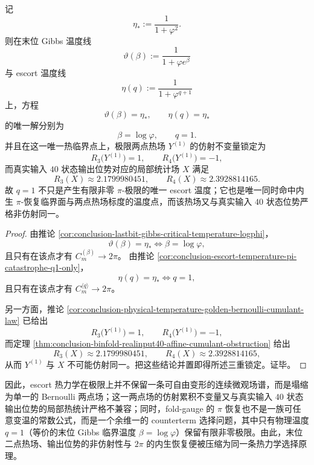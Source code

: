 \begin{corollary}[物理温度 \texorpdfstring{$q=1$}{q=1} 的唯一三重锁定]\label{cor:conclusion-physical-temperature-q1-unique-triple-lock}
记
\[
\eta_*:=\frac{1}{1+\varphi^2}.
\]
则在末位 Gibbs 温度线
\[
\vartheta(\beta):=\frac{1}{1+\varphi e^\beta}
\]
与 escort 温度线
\[
\eta(q):=\frac{1}{1+\varphi^{q+1}}
\]
上，方程
\[
\vartheta(\beta)=\eta_*,
\qquad
\eta(q)=\eta_*
\]
的唯一解分别为
\[
\beta=\log\varphi,
\qquad
q=1.
\]
并且在这一唯一热临界点上，极限两点热场 \(Y^{(1)}\) 的仿射不变量锁定为
\[
R_3\bigl(Y^{(1)}\bigr)=1,
\qquad
R_4\bigl(Y^{(1)}\bigr)=-1,
\]
而真实输入 \(40\) 状态输出位势对应的局部统计场 \(X\) 满足
\[
R_3(X)\approx 2.1799980451,
\qquad
R_4(X)\approx 2.3928814165.
\]
故 \(q=1\) 不只是产生有限非零 \(\pi\)-极限的唯一 escort 温度；它也是唯一同时命中内生 \(\pi\)-恢复临界面与两点热场标度的温度点，而该热场又与真实输入 \(40\) 状态位势严格非仿射同一。
\end{corollary}
\begin{proof}
由推论 \ref{cor:conclusion-lastbit-gibbs-critical-temperature-logphi}，
\[
\vartheta(\beta)=\eta_*
\iff
\beta=\log\varphi,
\]
且只有在该点才有
\(
C_m^{(\beta)}\to 2\pi
\)。
由推论 \ref{cor:conclusion-escort-temperature-pi-catastrophe-q1-only}，
\[
\eta(q)=\eta_*
\iff
q=1,
\]
且只有在该点才有
\(
C_m^{\langle q\rangle}\to 2\pi
\)。

另一方面，推论 \ref{cor:conclusion-physical-temperature-golden-bernoulli-cumulant-law} 已给出
\[
R_3\bigl(Y^{(1)}\bigr)=1,
\qquad
R_4\bigl(Y^{(1)}\bigr)=-1,
\]
而定理 \ref{thm:conclusion-binfold-realinput40-affine-cumulant-obstruction} 给出
\[
R_3(X)\approx 2.1799980451,
\qquad
R_4(X)\approx 2.3928814165,
\]
从而 \(Y^{(1)}\) 与 \(X\) 不可能仿射同一。把这些结论并置即得所述三重锁定。证毕。
\end{proof}

\noindent
因此，escort 热力学在极限上并不保留一条可自由变形的连续微观场谱，而是塌缩为单一的 Bernoulli 两点场；这一两点场的仿射累积不变量又与真实输入 \(40\) 状态输出位势的局部热统计严格不兼容；同时，fold-gauge 的 \(\pi\) 恢复也不是一族可任意变温的常数公式，而是一个余维一的 counterterm 选择问题，其中只有物理温度 \(q=1\)（等价的末位 Gibbs 临界温度 \(\beta=\log\varphi\)）保留有限非零极限。由此，末位二点热场、输出位势的非仿射性与 \(2\pi\) 的内生恢复便被压缩为同一条热力学选择原理。

\endinput
